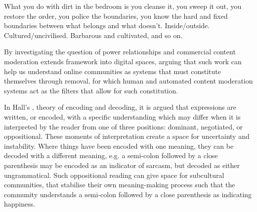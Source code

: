 \begin{aquote}
  What you do with dirt in the bedroom is you cleanse it, you sweep it out, you restore the order, you police the boundaries, you know the hard and fixed boundaries between what belongs and what doesn't. Inside/outside. Cultured/uncivilised. Barbarous and cultivated, and so on. \cite[p. 3]{Hall:1999}
\end{aquote}

By investigating the question of power relationships and commercial content moderation \citet{Lepawsky:2019} extends \citet{Douglas:1966} framework into digital spaces, arguing that such work can help us understand online communities as systems that must constitute themselves through removal, for which human and automated content moderation systems act as the filters that allow for such constitution.

In Hall's \citeyear{Hall:1997}, theory of encoding and decoding, it is argued that expressions are written, or encoded, with a specific understanding which may differ when it is interpreted by the reader from one of three positions: dominant, negotiated, or oppositional. These moments of interpretation create a space for uncertainty and instability. Where things have been encoded with one meaning, they can be decoded with a different meaning, e.g. a semi-colon followed by a close parenthesis may be encoded as an indicator of sarcasm, but decoded as either ungrammatical. Such oppositional reading can give space for subcultural communities, that stabilise their own meaning-making process such that the community understands a semi-colon followed by a close parenthesis as indicating happiness.


